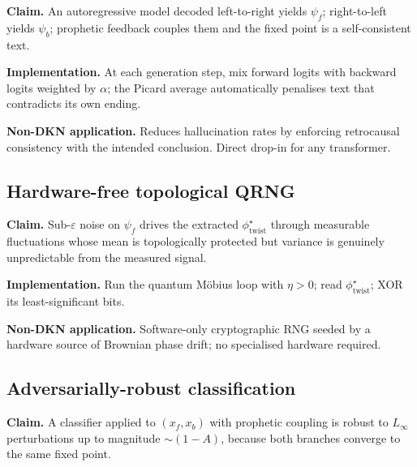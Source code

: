 \documentclass[11pt,a4paper]{article}
\theoremstyle{definition}
\newcommand{\psif}{\psi_{f}}
\newcommand{\psib}{\psi_{b}}
\newcommand{\phitwist}{\phi_{\mathrm{twist}}}
\newcommand{\contr}{A}
\begin{document}
\begin{tcolorbox}[noveltybox]
\textbf{Claim.} An autoregressive model decoded left-to-right yields
$\psif$; right-to-left yields $\psib$; prophetic feedback couples them
and the fixed point is a self-consistent text.
\end{tcolorbox}

\textbf{Implementation.} At each generation step, mix forward logits
with backward logits weighted by $\alpha$; the Picard average
automatically penalises text that contradicts its own ending.

\begin{tcolorbox}[applbox]
\textbf{Non-DKN application.}
Reduces hallucination rates by enforcing retrocausal consistency with
the intended conclusion. Direct drop-in for any transformer.
\end{tcolorbox}

\subsection{Hardware-free topological QRNG}\label{nov:27}

\begin{tcolorbox}[noveltybox]
\textbf{Claim.} Sub-$\varepsilon$ noise on $\psif$ drives the
extracted $\phitwist^\star$ through measurable fluctuations whose
mean is topologically protected but variance is genuinely
unpredictable from the measured signal.
\end{tcolorbox}

\textbf{Implementation.} Run the quantum M\"obius loop with
$\eta > 0$; read $\phitwist^\star$; XOR its least-significant bits.

\begin{tcolorbox}[applbox]
\textbf{Non-DKN application.}
Software-only cryptographic RNG seeded by a hardware source of
Brownian phase drift; no specialised hardware required.
\end{tcolorbox}

\subsection{Adversarially-robust classification}\label{nov:28}

\begin{tcolorbox}[noveltybox]
\textbf{Claim.} A classifier applied to $(x_f, x_b)$ with prophetic
coupling is robust to $L_\infty$ perturbations up to magnitude
$\sim(1-\contr)$, because both branches converge to the same fixed
point.
\end{tcolorbox}
\end{document}
